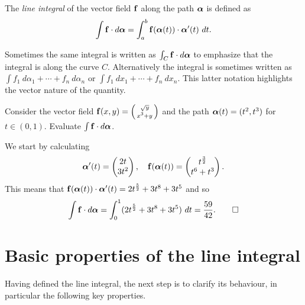 \begin{definition}%
    \label{def:line-integral}
    The \emph{line integral} of the vector field \(\mathbf{f}\) along the path \(\boldsymbol{\alpha}\) is defined as
    \[
        \int \mathbf{f} \cdot d\boldsymbol{\alpha} = \int_{a}^{b} \mathbf{f}(\boldsymbol{\alpha}(t)) \cdot \boldsymbol{\alpha}'(t) \ dt.
    \]
\end{definition}


Sometimes the same integral is written as \(\int_C \mathbf{f} \cdot d\boldsymbol{\alpha}  \) to emphasize that the integral is along the curve \(C\).
Alternatively the integral is sometimes written as \(\int f_1 \ d\alpha_1 + \cdots + f_n \ d\alpha_n\) or \(\int f_1 \ dx_1 + \cdots + f_n \ dx_n\).
This latter notation highlights the vector nature of the quantity.

\begin{example*}
    Consider the vector field \(\mathbf{f}(x,y) = \left(\begin{smallmatrix}
        \sqrt y \\ x^3 + y
    \end{smallmatrix}\right)\)
    and the path
    \(\boldsymbol{\alpha}(t)= (t^2,t^3)\) for \(t \in (0,1)\).
    Evaluate \(\int \mathbf{f} \cdot d\boldsymbol{\alpha}\).
\end{example*}
\begin{solution}
    We start by calculating
    \[
        \boldsymbol{\alpha}'(t) = \begin{pmatrix}
            2t \\ 3t^2
        \end{pmatrix},\\
        \quad
        \mathbf{f}(\boldsymbol{\alpha}(t)) = \begin{pmatrix}
            t^{\frac{3}{2}} \\ t^6 + t^3
        \end{pmatrix}.
    \]
    This means that \(\mathbf{f}(\boldsymbol{\alpha}(t)) \cdot  \boldsymbol{\alpha}'(t) =    2 t^{\frac{5}{2}} + 3t^8 + 3t^5\) and so
    \[
        \displaystyle\int \mathbf{f} \cdot d\boldsymbol{\alpha} = \displaystyle\int_{0}^{1} (2 t^{\frac{5}{2}} + 3t^8 + 3t^5 ) \ dt = \frac{59}{42}. \qedhere
    \]
\end{solution}

\section{Basic properties of the line integral}

Having defined the line integral, the next step is to clarify its behaviour, in particular the following key properties.

